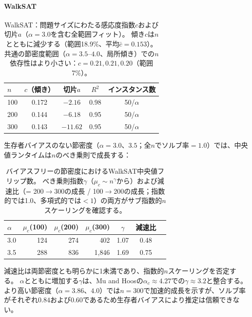 \documentclass[11pt,a4paper]{article}
\newcommand{\mc}{\mu_c}
\begin{document}
\paragraph{WalkSAT}

\begin{table}[h]
\centering
\begin{tabular}{lcccc}
\toprule
$n$ & $c$（傾き） & 切片$a$ & $R^2$ & インスタンス数 \\
\midrule
100 & 0.172 & $-2.16$  & 0.98 & 50/$\alpha$ \\
200 & 0.144 & $-6.18$  & 0.95 & 50/$\alpha$ \\
300 & 0.143 & $-11.62$ & 0.95 & 50/$\alpha$ \\
\bottomrule
\end{tabular}
\caption{WalkSAT：問題サイズにわたる感応度指数$c$および切片$a$（$\alpha = 3.0$を含む全範囲フィット）。
傾き$c$は$n$とともに減少する（範囲18.9\%、平均$\bar{c} = 0.153$）。
共通の節密度範囲（$\alpha = 3.5$--$4.0$、局所傾き）での$n$依存性はより小さい：$c = 0.21, 0.21, 0.20$（範囲7\%）。}
\label{tab:n_scaling_ws}
\end{table}

生存者バイアスのない節密度（$\alpha = 3.0$、$3.5$；全$n$でソルブ率$= 1.0$）では、中央値ランタイムは$n$のべき乗則で成長する：

\begin{table}[h]
\centering
\begin{tabular}{lrrrccc}
\toprule
$\alpha$ & $\mc$(100) & $\mc$(200) & $\mc$(300)
  & $\gamma$ & 減速比 \\
\midrule
3.0 & 124 & 274 & 402 & 1.07 & 0.48 \\
3.5 & 288 & 836 & 1{,}846 & 1.69 & 0.75 \\
\bottomrule
\end{tabular}
\caption{バイアスフリーの節密度におけるWalkSAT中央値フリップ数。
べき乗則指数$\gamma$（$\mc \sim n^\gamma$から）および減速比（= 200$\to$300の成長 / 100$\to$200の成長；指数的では1.0、多項式的では$< 1$）の両方がサブ指数的$n$スケーリングを確認する。}
\label{tab:n_scaling_ws_raw}
\end{table}

減速比は両節密度とも明らかに1未満であり、指数的$n$スケーリングを否定する。
$\alpha$とともに増加する$\gamma$は、Mu and Hoos\cite{MuHoos2015}の$\alpha_c \approx 4.27$での$\gamma \approx 3.2$と整合する。
より高い節密度（$\alpha = 3.86$、$4.0$）では$n = 300$で加速的成長を示すが、ソルブ率がそれぞれ$0.84$および$0.60$であるため生存者バイアスにより推定は信頼できない。
\end{document}
